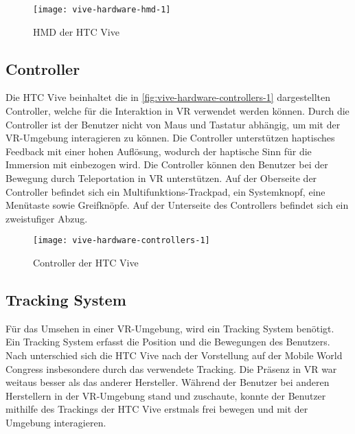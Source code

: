 \begin{figure}[!htbp]
	\centering
	\texttt{[image: vive-hardware-hmd-1]}
	\caption[HMD der HTC Vive]{\acs{HMD} der HTC Vive \cite{ViveHMD}}
	\label{fig:vive-hardware-hmd-1}
\end{figure}

\subsection{Controller}
Die HTC Vive beinhaltet die in \autoref{fig:vive-hardware-controllers-1} dargestellten Controller, welche für die Interaktion in \ac{VR} verwendet werden können. Durch die Controller ist der Benutzer nicht von Maus und Tastatur abhängig, um mit der \ac{VR}-Umgebung interagieren zu können. Die Controller unterstützen haptisches Feedback mit einer hohen Auflösung, wodurch der haptische Sinn für die Immersion mit einbezogen wird. Die Controller können den Benutzer bei der Bewegung durch Teleportation in \ac{VR} unterstützen. Auf der Oberseite der Controller befindet sich ein Multifunktions-Trackpad, ein Systemknopf, eine Menütaste sowie Greifknöpfe. Auf der Unterseite des Controllers befindet sich ein zweistufiger Abzug. \cite{ViveProduct}

\begin{figure}[!htbp]
	\centering
	\texttt{[image: vive-hardware-controllers-1]}
	\caption[Controller der HTC Vive]{Controller der HTC Vive \cite{ViveControllers}}
	\label{fig:vive-hardware-controllers-1}
\end{figure}

\subsection{Tracking System}
Für das Umsehen in einer \ac{VR}-Umgebung, wird ein Tracking System benötigt. Ein Tracking System erfasst die Position und die Bewegungen des Benutzers. Nach \citeauthor{Sauter.2015} unterschied sich die HTC Vive nach der Vorstellung auf der Mobile World Congress insbesondere durch das verwendete Tracking. Die Präsenz in \ac{VR} war weitaus besser als das anderer Hersteller. Während der Benutzer bei anderen Herstellern in der \ac{VR}-Umgebung stand und zuschaute, konnte der Benutzer mithilfe des Trackings der HTC Vive erstmals frei bewegen und mit der Umgebung interagieren. \cite{Sauter.2015} 

